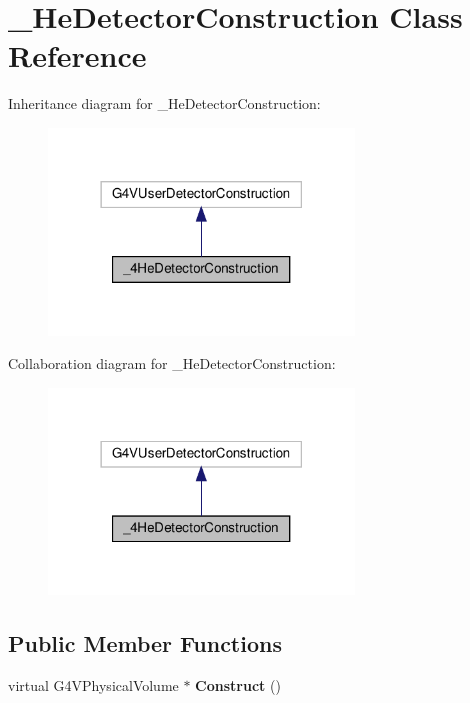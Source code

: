 \hypertarget{class__4HeDetectorConstruction}{}\section{\+\_\+He\+Detector\+Construction Class Reference}
\label{class__4HeDetectorConstruction}


Inheritance diagram for \+\_\+He\+Detector\+Construction\+:
\nopagebreak
\begin{figure}[H]
\begin{center}
\leavevmode
\includegraphics[width=230pt]{class__4HeDetectorConstruction__inherit__graph}
\end{center}
\end{figure}


Collaboration diagram for \+\_\+He\+Detector\+Construction\+:
\nopagebreak
\begin{figure}[H]
\begin{center}
\leavevmode
\includegraphics[width=230pt]{class__4HeDetectorConstruction__coll__graph}
\end{center}
\end{figure}
\subsection*{Public Member Functions}
\begin{DoxyCompactItemize}
\item 
\mbox{\label{class__4HeDetectorConstruction_afaadb532467d010a0d024e5ea5fcbff2}} 
virtual G4\+V\+Physical\+Volume $\ast$ {\bfseries Construct} ()
\end{DoxyCompactItemize}


